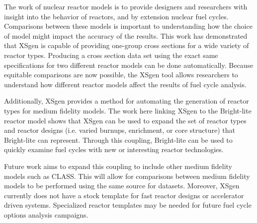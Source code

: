 \documentclass{article}
\begin{document}
The work of nuclear reactor models is to provide designers and researchers with insight
into the behavior of reactors, and by extension nuclear fuel cycles. Comparisons between
these models is important to understanding how the choice of model might impact the
accuracy of the results. This work has demonstrated that XSgen is capable of
providing one-group cross sections for a wide variety of reactor types.
Producing a cross section data set using the exact same specifications for two different reactor models 
can be done automatically. Because equitable comparisons are now possible, the XSgen tool allows
researchers to understand how different reactor models affect the results of fuel cycle analysis.

Additionally, XSgen provides a method for automating the generation of reactor types for
medium fidelity models. The work here linking XSgen to the Bright-lite reactor model shows
that XSgen can be used to expand the set of reactor types and reactor designs
(i.e. varied burnups, enrichment, or core structure) that Bright-lite can represent.
Through this coupling, Bright-lite can be used to quickly examine fuel cycles with new or
interesting reactor technologies.

Future work aims to expand this coupling to include other medium fidelity models such as CLASS.
This will allow for comparisons between medium fidelity models to be performed using the
same source for datasets. Moreover, XSgen currently does not have a stock template for
fast reactor designs or accelerator driven systems. Specialized reactor templates may be
needed for future fuel cycle options analysis campaigns.



\end{document}
